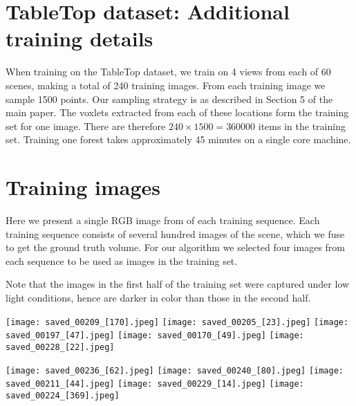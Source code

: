 \documentclass[10pt,onecolumn,letterpaper]{article}
\begin{document}
\newcommand{\omaheight}{0.12\columnwidth}
\begin{longtable}{ccccc}
    
\end{longtable}
\label{fig:bb}


\newpage
\section{TableTop dataset: Additional training details}

When training on the TableTop dataset, we train on 4 views from each of 60 scenes, making a total of 240 training images.
From each training image we sample 1500 points. Our sampling strategy is as described in Section 5 of the main paper.
The voxlets extracted from each of these locations form the training set for one image.
There are therefore $240 \times 1500 = 360000$ items in the training set.
Training one forest takes approximately 45 minutes on a single core machine.

\newpage
\section{Training images}
Here we present a single RGB image from of each training sequence.
Each training sequence consists of several hundred images of the scene, which we fuse to get the ground truth volume.
For our algorithm we selected four images from each sequence to be used as images in the training set.

Note that the images in the first half of the training set were captured under low light conditions, hence are darker in color than those in the second half.

\newcommand{\trainwidth}{0.18\columnwidth}

\texttt{[image: saved\_00209\_[170].jpeg]}
\texttt{[image: saved\_00205\_[23].jpeg]}
\texttt{[image: saved\_00197\_[47].jpeg]}
\texttt{[image: saved\_00170\_[49].jpeg]}
\texttt{[image: saved\_00228\_[22].jpeg]}

 \texttt{[image: saved\_00236\_[62].jpeg]}
 \texttt{[image: saved\_00240\_[80].jpeg]}
 \texttt{[image: saved\_00211\_[44].jpeg]}
 \texttt{[image: saved\_00229\_[14].jpeg]}
 \texttt{[image: saved\_00224\_[369].jpeg]}
\end{document}
